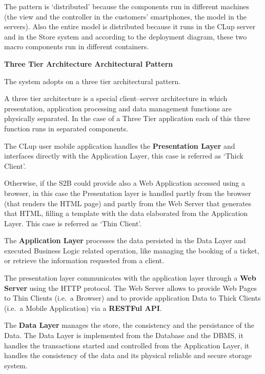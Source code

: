 The pattern is `distributed' because the components run in different machines (the view and the controller in the customers' smartphones, the model in the servers). Also the entire model is distributed because it runs in the CLup server and in the Store system and according to the deployment diagram, these two macro components run in different containers.

\medskip

\textbf{Three Tier Architecture Architectural Pattern}

\medskip

The system adopts on a three tier architectural pattern.

A three tier architecture is a special client–server architecture in which presentation, application processing and data management functions are physically separated. In the case of a Three Tier application each of this three function runs in separated components.

The CLup user mobile application handles the \textbf{Presentation Layer} and interfaces directly with the Application Layer, this case is referred as `Thick Client'.

Otherwise, if the S2B could provide also a Web Application accessed using a browser, in this case the Presentation layer is handled partly from the browser (that renders the HTML page) and partly from the Web Server that generates that HTML, filling a template with the data elaborated from the Application Layer. This case is referred as `Thin Client'.

The \textbf{Application Layer} processes the data persisted in the Data Layer and executed Business Logic related operation, like managing the booking of a ticket, or retrieve the information requested from a client.  

The presentation layer communicates with the application layer through a \textbf{Web Server} using the HTTP protocol. The Web Server allows to provide Web Pages to Thin Clients (i.e.~a Browser) and to provide application Data to Thick Clients (i.e.~a Mobile Application) via a \textbf{RESTFul API}.

The \textbf{Data Layer} manages the store, the consistency and the persistance of the Data. The Data Layer is implemented from the Database and the DBMS, it handles the transactions started and controlled from the Application Layer, it handles the consistency of the data and its physical reliable and secure storage system.

